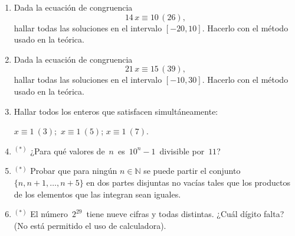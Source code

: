 \documentclass[a4paper,12pt,twoside,spanish,reqno]{amsbook}
\numberwithin{equation}{section}
\begin{document}
\begin{enumerate}[resume]
\item Dada la ecuación de congruencia
$$14\,x\equiv 10 \, (26),$$
hallar todas las soluciones en el intervalo $[-20,10]$. Hacerlo con el método usado en la teórica.
\item Dada la ecuación de congruencia
$$21\,x\equiv 15 \, (39),$$
hallar todas las soluciones en el intervalo $[-10,30]$. Hacerlo con el método usado en la teórica. 

\item Hallar todos los enteros que satisfacen simultáneamente:

$x \equiv 1\ ( 3); $ \qquad $x \equiv 1 \ ( 5)$; \qquad $x \equiv 1\ ( 7)$.

\item${}^{(*)}$  ¿Para qué valores de \,$n$\, es \,$10^n-1$\, divisible por \,$11$?

\item${}^{(*)}$ Probar que para ning\'un $n\in\mathbb N$ se puede partir el conjunto $\{n,n+1,\ldots, n+5\}$ en dos partes disjuntas no vacías tales que los productos de los elementos que las integran sean iguales.

\item${}^{(*)}$  El número \,$2^{29}$\, tiene nueve cifras y todas distintas.
¿Cuál dígito falta? (No está permitido el uso de calculadora).

\end{enumerate}
\end{document}
